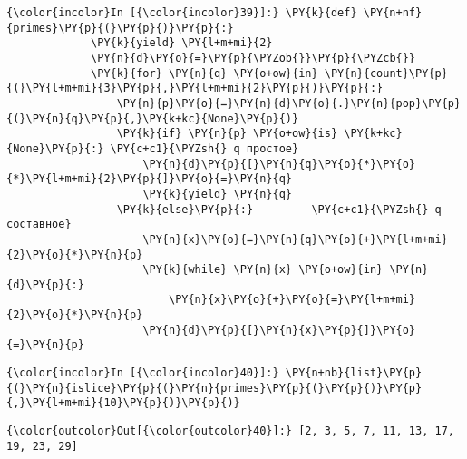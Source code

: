     \begin{Verbatim}[commandchars=\\\{\}]
{\color{incolor}In [{\color{incolor}39}]:} \PY{k}{def} \PY{n+nf}{primes}\PY{p}{(}\PY{p}{)}\PY{p}{:}
             \PY{k}{yield} \PY{l+m+mi}{2}
             \PY{n}{d}\PY{o}{=}\PY{p}{\PYZob{}}\PY{p}{\PYZcb{}}
             \PY{k}{for} \PY{n}{q} \PY{o+ow}{in} \PY{n}{count}\PY{p}{(}\PY{l+m+mi}{3}\PY{p}{,}\PY{l+m+mi}{2}\PY{p}{)}\PY{p}{:}
                 \PY{n}{p}\PY{o}{=}\PY{n}{d}\PY{o}{.}\PY{n}{pop}\PY{p}{(}\PY{n}{q}\PY{p}{,}\PY{k+kc}{None}\PY{p}{)}
                 \PY{k}{if} \PY{n}{p} \PY{o+ow}{is} \PY{k+kc}{None}\PY{p}{:} \PY{c+c1}{\PYZsh{} q простое}
                     \PY{n}{d}\PY{p}{[}\PY{n}{q}\PY{o}{*}\PY{o}{*}\PY{l+m+mi}{2}\PY{p}{]}\PY{o}{=}\PY{n}{q}
                     \PY{k}{yield} \PY{n}{q}
                 \PY{k}{else}\PY{p}{:}         \PY{c+c1}{\PYZsh{} q составное}
                     \PY{n}{x}\PY{o}{=}\PY{n}{q}\PY{o}{+}\PY{l+m+mi}{2}\PY{o}{*}\PY{n}{p}
                     \PY{k}{while} \PY{n}{x} \PY{o+ow}{in} \PY{n}{d}\PY{p}{:}
                         \PY{n}{x}\PY{o}{+}\PY{o}{=}\PY{l+m+mi}{2}\PY{o}{*}\PY{n}{p}
                     \PY{n}{d}\PY{p}{[}\PY{n}{x}\PY{p}{]}\PY{o}{=}\PY{n}{p}
\end{Verbatim}


    \begin{Verbatim}[commandchars=\\\{\}]
{\color{incolor}In [{\color{incolor}40}]:} \PY{n+nb}{list}\PY{p}{(}\PY{n}{islice}\PY{p}{(}\PY{n}{primes}\PY{p}{(}\PY{p}{)}\PY{p}{,}\PY{l+m+mi}{10}\PY{p}{)}\PY{p}{)}
\end{Verbatim}


\begin{Verbatim}[commandchars=\\\{\}]
{\color{outcolor}Out[{\color{outcolor}40}]:} [2, 3, 5, 7, 11, 13, 17, 19, 23, 29]
\end{Verbatim}

